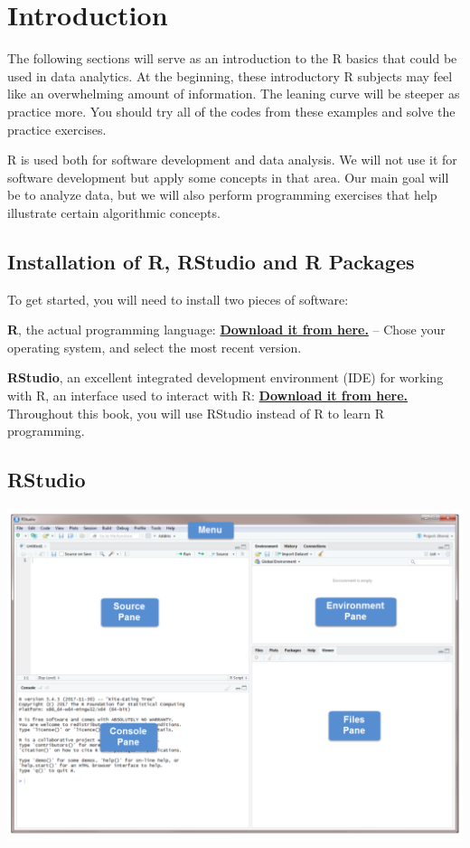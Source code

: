 \documentclass[
]{book}
\theoremstyle{definition}
\theoremstyle{definition}
\theoremstyle{definition}
\theoremstyle{definition}
\theoremstyle{remark}
\begin{document}
\hypertarget{introduction}{%
\chapter{Introduction}\label{introduction}}

The following sections will serve as an introduction to the R basics that could be used in data analytics. At the beginning, these introductory R subjects may feel like an overwhelming amount of information. The leaning curve will be steeper as practice more. You should try all of the codes from these examples and solve the practice exercises.

R is used both for software development and data analysis. We will not use it for software development but apply some concepts in that area. Our main goal will be to analyze data, but we will also perform programming exercises that help illustrate certain algorithmic concepts.

\hypertarget{installation-of-r-rstudio-and-r-packages}{%
\section{Installation of R, RStudio and R Packages}\label{installation-of-r-rstudio-and-r-packages}}

To get started, you will need to install two pieces of software:

\textbf{R}, the actual programming language: \href{https://cran.r-project.org}{\textbf{Download it from here.}}
-- Chose your operating system, and select the most recent version.

\textbf{RStudio}, an excellent integrated development environment (IDE) for working with R, an interface used to interact with R: \href{https://www.rstudio.com}{\textbf{Download it from here.}} Throughout this book, you will use RStudio instead of R to learn R programming.

\hypertarget{rstudio}{%
\section{RStudio}\label{rstudio}}

\includegraphics[width=15.15in]{png/Rstudio}
\end{document}
